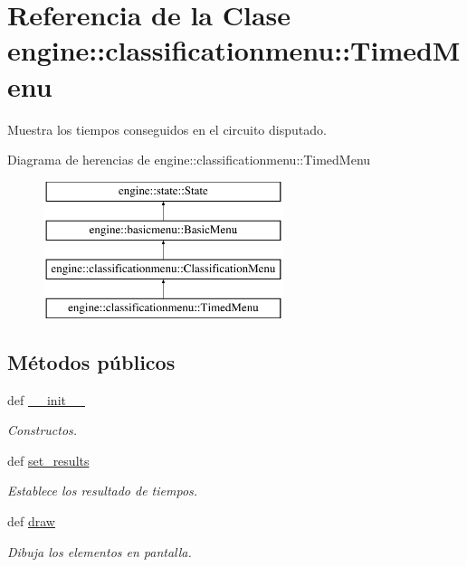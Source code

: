\hypertarget{classengine_1_1classificationmenu_1_1TimedMenu}{
\section{\-Referencia de la \-Clase engine\-:\-:classificationmenu\-:\-:\-Timed\-Menu}
\label{classengine_1_1classificationmenu_1_1TimedMenu}
}


\-Muestra los tiempos conseguidos en el circuito disputado.  


\-Diagrama de herencias de engine\-:\-:classificationmenu\-:\-:\-Timed\-Menu\begin{figure}[H]
\begin{center}
\leavevmode
\includegraphics[height=4.000000cm]{classengine_1_1classificationmenu_1_1TimedMenu}
\end{center}
\end{figure}
\subsection*{\-Métodos públicos}
\begin{DoxyCompactItemize}
\item 
def \hyperlink{classengine_1_1classificationmenu_1_1TimedMenu_a386dad87e34322279943cc2f25d15b06}{\-\_\-\-\_\-init\-\_\-\-\_\-}
\begin{DoxyCompactList}\small\item\em \-Constructos. \end{DoxyCompactList}\item 
def \hyperlink{classengine_1_1classificationmenu_1_1TimedMenu_a2de8fe6014a109a80fa60d75f1983b41}{set\-\_\-results}
\begin{DoxyCompactList}\small\item\em \-Establece los resultado de tiempos. \end{DoxyCompactList}\item 
def \hyperlink{classengine_1_1classificationmenu_1_1TimedMenu_af63713ab80dfade211cf1d54e66088d2}{draw}
\begin{DoxyCompactList}\small\item\em \-Dibuja los elementos en pantalla. \end{DoxyCompactList}\end{DoxyCompactItemize}
